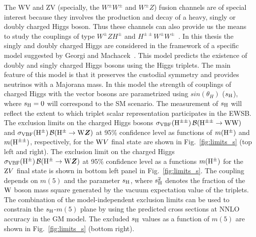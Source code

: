 The WV and ZV (specially, the $W^\pm W^\pm$ and $W^\pm Z$) fusion channels are of special interest because they involves the production and decay of a heavy, singly or doubly charged Higgs boson. Thus these channels can also provide us the means to study the couplings of type $W^\pm Z H^\pm$ and $H^{\pm \pm}W^\pm W^\pm$~\cite{Vega1990}. In this thesis the singly and doubly charged Higgs are considered in the framework of a specific model suggested by Georgi and Machacek~\cite{GEORGI1985463}. This model predicts the existence of doubly and singly charged Higgs bosons using the Higgs triplets. The main feature of this model is that it preserves the custodial symmetry and provides neutrinos with a Majorana mass. 
In this model the strength of couplings of charged Higgs with the vector bosons are parametrized using $sin(\theta_H)$ ($s_{\mathrm{H}}$), where $s_{\mathrm{H}}=0$ will correspond to the SM scenario. The measurement of $s_{\mathrm{H}}$ will reflect the extent to which triplet scalar representation participates in the EWSB.
%
The exclusion limits on the charged Higgs bosons $\sigma_\mathrm{VBF}(\mathrm{H^{\pm\pm}}) \, \mathcal{B}(\mathrm{H^{\pm\pm}}\to \mathrm{W}\mathrm{W})$ and $\sigma_\mathrm{VBF}(\mathrm{H}^{\pm}) \, \mathcal{B}(\mathrm{H}^{\pm}\to \mathrm{W}\boldsymbol{Z})$ at 95\% confidence level as functions of $m(\mathrm{H}^{\pm})$ and $m(\mathrm{H^{\pm\pm}})$, respectively, for the $\mathrm{W} V$ final state are shown in Fig.~\ref{fig:limits_s} (top left and right).
The exclusion limit on the charged Higgs $\sigma_\mathrm{VBF}(\mathrm{H}^{\pm}) \, \mathcal{B}(\mathrm{H}^{\pm}\to \mathrm{W}\boldsymbol{Z})$ at 95\% confidence level as a functions $m(\mathrm{H}^{\pm})$ for the $\mathrm{Z} V$ final state is shown in bottom left panel in Fig.~\ref{fig:limits_s}.
The coupling depends on $m(5)$ and the parameter $s_{\mathrm{H}}$, where $s_{\mathrm{H}}^2$ denotes the fraction of the $\mathrm{W}$ boson mass square generated by the vacuum expectation value of the triplets.
The combination of the model-independent exclusion limits can be used to constrain the $s_{\mathrm{H}}$-$m(5)$ plane by using the predicted cross sections at NNLO accuracy in the GM model.
The excluded $s_{\mathrm{H}}$ values as a function of $m(5)$ are shown in Fig.~\ref{fig:limits_s} (bottom right).

